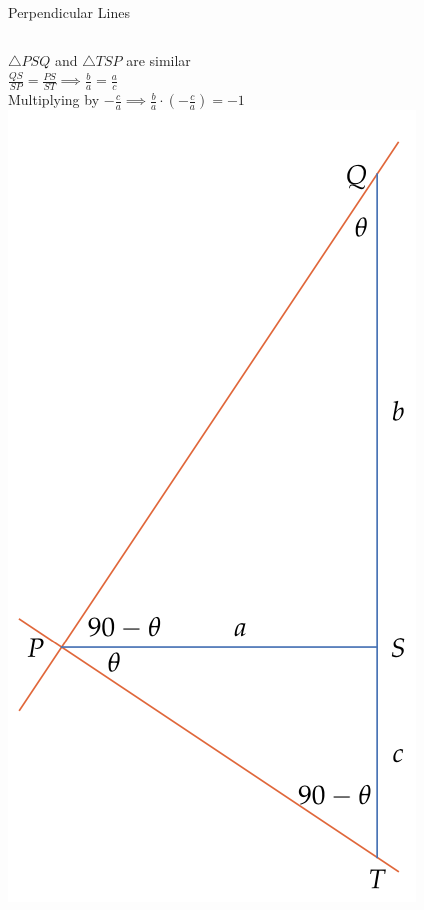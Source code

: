 \documentclass{beamer}
\begin{document}
  \begin{frame}{Perpendicular Lines}
    \begin{columns}
      \(\triangle PSQ \) and \( \triangle TSP \) are similar \\ 

      \bigskip
      \(\frac{QS}{SP} = \frac{PS}{ST} \implies \frac{b}{a} = \frac{a}{c} \) \\

      \bigskip
      Multiplying by \(-\frac{c}{a} \implies \frac{b}{a} \cdot \left( - \frac{c}{a} \right) = -1  \) \\

      \centering
      \includegraphics[width=0.5\linewidth]{perpendicular.png} \\ %
  \end{columns}
  
  \end{frame} 
\end{document}

